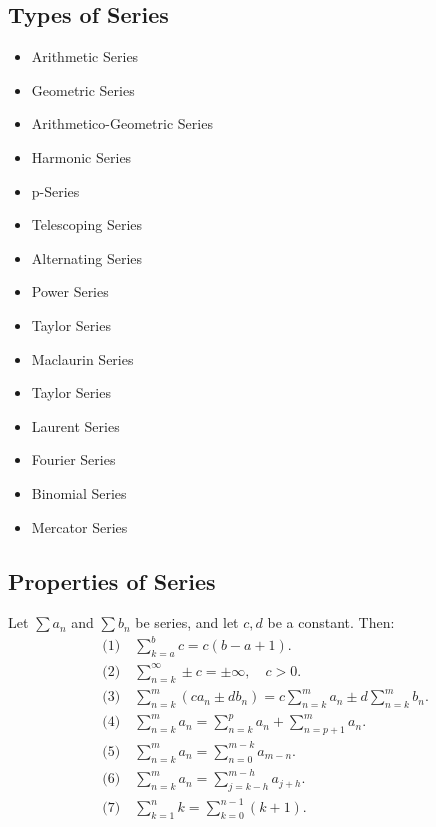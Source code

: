 \documentclass[a4paper,11pt]{article}
\begin{document}


\subsection{Types of Series}

\begin{tcolorbox}
    \begin{multicols}{3}
        \begin{itemize}
          \item Arithmetic Series
          \item Geometric Series
          \item Arithmetico-Geometric Series
          \item Harmonic Series
          \item p-Series
          \item Telescoping Series
          \item Alternating Series
          \item Power Series
          \item Taylor Series
          \item Maclaurin Series
          \item Taylor Series
          \item Laurent Series
          \item Fourier Series
          \item Binomial Series
          \item Mercator Series
        \end{itemize}
    \end{multicols}
\end{tcolorbox}




\subsection{Properties of Series}

\begin{tcolorbox}
    Let $\textstyle \sum a_n$ and $\textstyle \sum b_n$ be series, and let $c, d$ be a constant. Then:
    \[
    \begin{aligned}
        &\text{(1)} \quad \sum_{k=a}^b c = c(b - a + 1). \\[8pt]  
        &\text{(2)} \quad \sum_{n=k}^{\infty} \pm c = \pm \infty, \quad c > 0. \\[8pt]
        &\text{(3)} \quad \sum_{n=k}^{m} (ca_n \pm db_n) = c \sum_{n=k}^{m} a_n \pm d \sum_{n=k}^{m} b_n. \\[8pt]
        &\text{(4)} \quad \sum_{n=k}^{m} a_n = \sum_{n=k}^{p} a_n + \sum_{n=p+1}^{m} a_n. \\[8pt]
        &\text{(5)} \quad \sum_{n=k}^{m} a_n = \sum_{n=0}^{m-k} a_{m-n}. \\[8pt]
        &\text{(6)} \quad \sum_{n=k}^{m} a_n = \sum_{j=k-h}^{m-h} a_{j+h}. \\[8pt]
        &\text{(7)} \quad \sum_{k=1}^n k = \sum_{k=0}^{n-1} (k + 1). \\[8pt]
    \end{aligned}
    \]
\end{tcolorbox}
\end{document}
